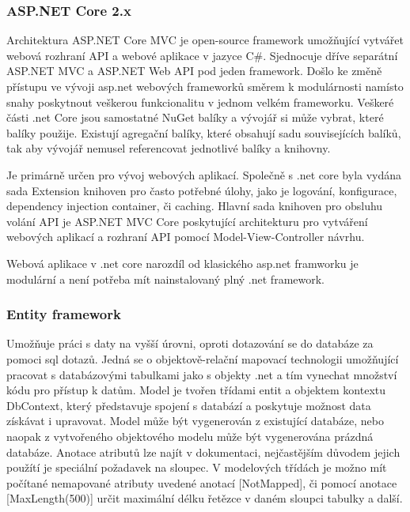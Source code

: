 \documentclass[FM,BP]{tulthesis}
\begin{document}
            \subsubsection{ASP.NET Core 2.x}
                Architektura ASP.NET Core MVC je open-source framework umožňující vytvářet webová rozhraní API a webové aplikace v jazyce C\#. 
                Sjednocuje dříve separátní ASP.NET MVC a ASP.NET Web API pod jeden framework. 
                Došlo ke změně přístupu ve vývoji asp.net webových frameworků směrem k modulárnosti namísto snahy poskytnout veškerou funkcionalitu v jednom velkém frameworku. 
                Veškeré části .net Core jsou samostatné NuGet balíky a vývojář si může vybrat, které balíky použije. 
                Existují agregační balíky, které obsahují sadu souvisejících balíků, tak aby vývojář nemusel referencovat jednotlivé balíky a knihovny.\cite{1}

                Je primárně určen pro vývoj webových aplikací. 
                Společně s .net core byla vydána sada Extension knihoven pro často potřebné úlohy, jako je logování, konfigurace, dependency injection container, či caching. 
                Hlavní sada knihoven pro obsluhu volání API je ASP.NET MVC Core poskytující architekturu pro vytváření webových aplikací a rozhraní API pomocí Model-View-Controller návrhu. \cite{1}

                Webová aplikace v .net core narozdíl od klasického asp.net framworku je modulární a není potřeba mít nainstalovaný plný .net framework.

            \subsubsection{Entity framework}
                Umožňuje práci s daty na vyšší úrovni, oproti dotazování se do databáze za pomoci sql dotazů. 
                Jedná se o objektově-relační mapovací technologii umožňující pracovat s databázovými tabulkami jako s objekty .net a tím vynechat množství kódu pro přístup k datům. 
                Model je tvořen třídami entit a objektem kontextu DbContext, který představuje spojení s databází a poskytuje možnost data získávat i upravovat. 
                Model může být vygenerován z existující databáze, nebo naopak z vytvořeného objektového modelu může být vygenerována prázdná databáze.
                Anotace atributů lze najít v dokumentaci, nejčastějším důvodem jejich použítí je speciální požadavek na sloupec.
                V modelových třídách je možno mít počítané nemapované atributy uvedené anotací [NotMapped], či pomocí anotace [MaxLength(500)] 
                určit maximální délku řetězce v daném sloupci tabulky a další.
                \cite{4}
\end{document}
